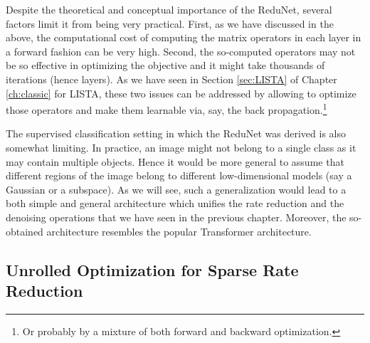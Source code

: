 \documentclass[../../book-main.tex]{subfiles}
\begin{document}
Despite the theoretical and conceptual importance of the ReduNet, several factors limit it from being very practical. First, as we have discussed in the above, the computational cost of computing the matrix operators in  each layer in a forward fashion can be very high. Second, the so-computed operators may not be so effective in optimizing the objective and it might take thousands of iterations (hence layers). As we have seen  in Section \ref{sec:LISTA} of Chapter \ref{ch:classic} for LISTA, these two issues can be addressed by allowing to optimize those operators and make them learnable via, say, the back propagation.\footnote{Or probably by a mixture of both forward and backward optimization.}

The supervised classification setting in which the ReduNet was derived is also somewhat limiting. In practice, an image might not belong to a single class as it may contain multiple objects. Hence it would be more general to assume that different regions of the image belong to  different low-dimensional models (say a Gaussian or a subspace). As we will see, such a generalization would lead to a both simple and general architecture which unifies the rate reduction and the denoising operations that we have seen in the previous chapter. Moreover, the so-obtained architecture resembles the popular Transformer architecture.



\subsection{Unrolled Optimization for Sparse Rate Reduction}

\end{document}
